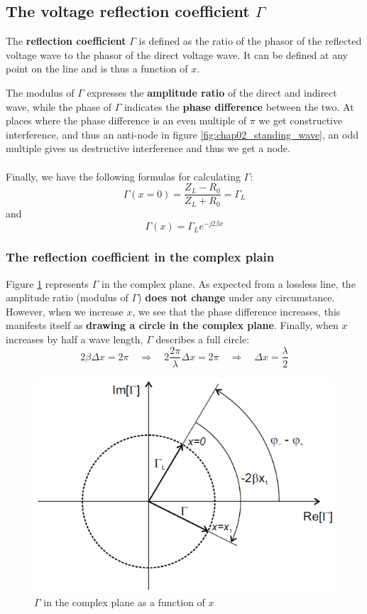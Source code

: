 \documentclass[../transmission.tex]{subfiles}
\begin{document}
		\subsection{The voltage reflection coefficient $\Gamma$}
			The \textbf{reflection coefficient} $\Gamma$ is defined as the ratio of the phasor of the reflected voltage wave to the phasor of the direct voltage wave. It can be defined at any point on the line and is thus a function of $x$.
			
			The modulus of $\Gamma$ expresses the \textbf{amplitude ratio} of the direct and indirect wave, while the phase of $\Gamma$ indicates the \textbf{phase difference} between the two. At places where the phase difference is an even multiple of $\pi$ we get constructive interference, and thus an anti-node in figure \ref{fig:chap02_standing_wave}, an odd multiple gives us destructive interference and thus we get a node. \\
			\\
			Finally, we have the following formulas for calculating $\Gamma$:
			\begin{equation}
				\Gamma(x=0) = \frac{Z_L-R_0}{Z_L+R_0} = \Gamma_L
			\end{equation}
			and
			\begin{equation}
				\Gamma(x)=\Gamma_Le^{-j2\beta x}
			\end{equation}
			
			\subsubsection{The reflection coefficient in the complex plain}
				Figure \ref{fig:chap02_gamma_complex} represents $\Gamma$ in the complex plane. As expected from a lossless line, the amplitude ratio (modulus of $\Gamma$) \textbf{does not change} under any circumstance. However, when we increase $x$, we see that the phase difference increases, this manifests itself as \textbf{drawing a circle in the complex plane}. Finally, when $x$ increases by half a wave length, $\Gamma$ describes a full circle:
				\begin{equation}
					2\beta\Delta x= 2\pi \quad\Rightarrow\quad 2\frac{2\pi}{\lambda}\Delta x = 2\pi \quad\Rightarrow\quad \Delta x = \frac{\lambda}{2}
				\end{equation}
				\begin{figure}[h]
					\centering
					\includegraphics[width=0.5\linewidth]{../assets/chap02_gamma_complex.png}
					\caption{$\Gamma$ in the complex plane as a function of $x$}
					\label{fig:chap02_gamma_complex}
				\end{figure}
				
\end{document}
